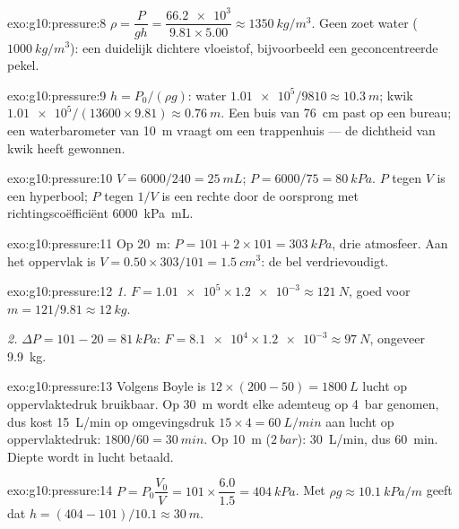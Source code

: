 \begin{solution}{exo:g10:pressure:8}
$\rho = \dfrac{P}{g h} = \dfrac{\num{66.2e3}}{9.81 \times 5.00}
\approx \qty{1350}{kg/m^3}$. Geen zoet water ($\qty{1000}{kg/m^3}$):
een duidelijk dichtere vloeistof, bijvoorbeeld een geconcentreerde
pekel.
\end{solution}

\begin{solution}{exo:g10:pressure:9}
$h = P_0/(\rho g)$: water
$\num{1.01e5}/9810 \approx \qty{10.3}{m}$; kwik
$\num{1.01e5}/(13600 \times 9.81) \approx \qty{0.76}{m}$. Een buis van
\qty{76}{cm} past op een bureau; een waterbarometer van \qty{10}{m}
vraagt om een trappenhuis --- de dichtheid van kwik heeft gewonnen.
\end{solution}

\begin{solution}{exo:g10:pressure:10}
$V = 6000/240 = \qty{25}{mL}$; $P = 6000/75 = \qty{80}{kPa}$. $P$ tegen
$V$ is een hyperbool; $P$ tegen $1/V$ is een rechte door de oorsprong
met richtingscoëfficiënt \qty{6000}{kPa.mL}.
\end{solution}

\begin{solution}{exo:g10:pressure:11}
Op \qty{20}{m}: $P = 101 + 2 \times 101 = \qty{303}{kPa}$, drie
atmosfeer. Aan het oppervlak is
$V = 0.50 \times 303/101 = \qty{1.5}{cm^3}$: de bel verdrievoudigt.
\end{solution}

\begin{solution}{exo:g10:pressure:12}
\emph{1.} $F = \num{1.01e5} \times \num{1.2e-3} \approx \qty{121}{N}$,
goed voor $m = 121/9.81 \approx \qty{12}{kg}$.

\emph{2.} $\Delta P = 101 - 20 = \qty{81}{kPa}$:
$F = \num{8.1e4} \times \num{1.2e-3} \approx \qty{97}{N}$, ongeveer
\qty{9.9}{kg}.
\end{solution}

\begin{solution}{exo:g10:pressure:13}
Volgens Boyle is $12 \times (200 - 50) = \qty{1800}{L}$ lucht op
oppervlaktedruk bruikbaar. Op \qty{30}{m} wordt elke ademteug op
\qty{4}{bar} genomen, dus kost \qty{15}{L/min} op omgevingsdruk
$15 \times 4 = \qty{60}{L/min}$ aan lucht op oppervlaktedruk:
$1800/60 = \qty{30}{min}$. Op \qty{10}{m} ($\qty{2}{bar}$):
\qty{30}{L/min}, dus \qty{60}{min}. Diepte wordt in lucht betaald.
\end{solution}

\begin{solution}{exo:g10:pressure:14}
$P = P_0 \dfrac{V_0}{V} = 101 \times \dfrac{6.0}{1.5} =
\qty{404}{kPa}$. Met $\rho g \approx \qty{10.1}{kPa/m}$ geeft dat
$h = (404 - 101)/10.1 \approx \qty{30}{m}$.
\end{solution}

